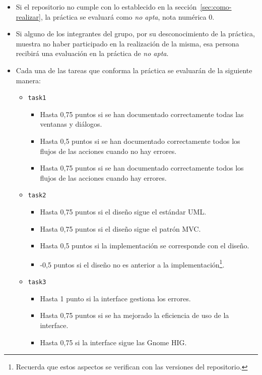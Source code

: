 \documentclass[11pt,a4paper]{article}
\begin{document}
\begin{itemize}
\item Si el repositorio no cumple con lo establecido en la
  sección~\ref{sec:como-realizar}, la práctica se evaluará como
  \emph{no apta}, nota numérica 0.

\item Si alguno de los integrantes del grupo, por su desconocimiento
  de la práctica, muestra no haber participado en la realización de la
  misma, esa persona recibirá una evaluación en la práctica de
  \emph{no apta}.

\item Cada una de las tareas que conforma la práctica se evaluarán de
  la siguiente manera:

  \begin{itemize}
  \item \texttt{task1}
    \begin{itemize}
    \item Hasta 0,75 puntos si se han documentado correctamente todas
      las ventanas y diálogos.
    \item Hasta 0,5 puntos si se han documentado correctamente todos
      los flujos de las acciones cuando no hay errores.
    \item Hasta 0,75 puntos si se han documentado correctamente todos
      los flujos de las acciones cuando hay errores.
    \end{itemize}
  
  \item \texttt{task2}

    \begin{itemize}
    \item Hasta 0,75 puntos si el diseño sigue el estándar UML.
    \item Hasta 0,75 puntos si el diseño sigue el patrón MVC.
    \item Hasta 0,5 puntos si la implementación se corresponde con el
      diseño.
    \item -0,5 puntos si el diseño no es anterior a la
      implementación\footnote{Recuerda que estos aspectos se verifican
        con las versiones del repositorio.}.
    \end{itemize}

  \item \texttt{task3}

    \begin{itemize}
    \item Hasta 1 punto si la interface gestiona los errores.
    \item Hasta 0,75 puntos si se ha mejorado la eficiencia de uso de
      la interface.
    \item Hasta 0,75 si la interface sigue las Gnome HIG.
    \end{itemize}


\end{itemize}
\end{itemize}
\end{document}
